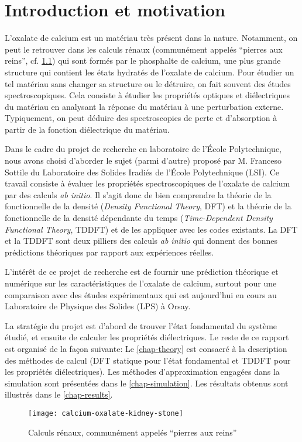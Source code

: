 \chapter{Introduction et motivation}
\label{chap-intro}
L'oxalate de calcium est un matériau très présent dans la nature.
Notamment, on peut le retrouver dans les calculs rénaux
(communément appelés ``pierres aux reins'', cf. \cref{fig-calcul})
qui sont formés par le phosphalte de calcium,
une plus grande structure qui contient les états hydratés de l'oxalate de calcium.
Pour étudier un tel matériau sans changer sa structure ou le détruire,
on fait souvent des études spectroscopiques.
Cela consiste à étudier les propriétés optiques et diélectriques du matériau en
analysant la réponse du matériau à une perturbation externe.
Typiquement, on peut déduire des spectroscopies de perte et d'absorption
à partir de la fonction diélectrique du matériau.

Dans le cadre du projet de recherche en laboratoire de l'École Polytechnique,
nous avons choisi d'aborder le sujet (parmi d'autre) proposé par M. Franceso Sottile
du Laboratoire des Solides Iradiés de l'École Polytechnique (LSI).
Ce travail consiste à évaluer les propriétés spectroscopiques de l'oxalate de calcium par des calculs \textit{ab initio}.
Il s'agit donc de bien comprendre la théorie de la fonctionnelle de la densité
(\textit{Density Functional Theory}, DFT)
et la théorie de la fonctionnelle de la densité dépendante du temps
(\textit{Time-Dependent Density Functional Theory}, TDDFT)
et de les appliquer avec les codes existants.
La DFT et la TDDFT sont deux pilliers des calculs \textit{ab initio}
qui donnent des bonnes prédictions théoriques par rapport aux expériences réelles.

L'intérêt de ce projet de recherche est de fournir une prédiction théorique et numérique
sur les caractéristiques de l'oxalate de calcium,
surtout pour une comparaison avec des études expérimentaux qui est aujourd'hui en cours
au Laboratoire de Physique des Solides (LPS) à Orsay.

La stratégie du projet est d'abord de trouver l'état fondamental du système étudié,
et ensuite de calculer les propriétés diélectriques.
Le reste de ce rapport est organisé de la façon suivante:
Le \cref{chap-theory} est consacré à la description des méthodes de calcul
(DFT statique pour l'état fondamental et TDDFT pour les propriétés diélectriques).
Les méthodes d'approximation engagées dans la simulation sont présentées dans le \cref{chap-simulation}.
Les résultats obtenus sont illustrés dans le \cref{chap-results}.
\begin{figure}[h!]
  \vspace{6pt} 
  \centering
  \texttt{[image: calcium-oxalate-kidney-stone]}
  \caption{Calculs rénaux, communément appelés ``pierres aux reins''}\label{fig-calcul}
\end{figure}
